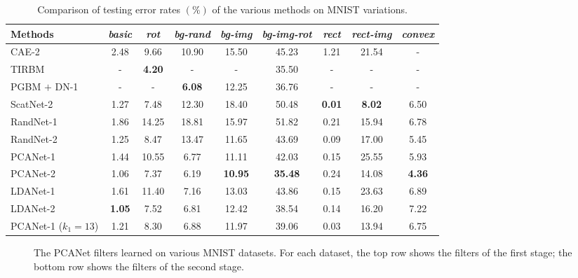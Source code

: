 \documentclass[10pt,journal,compsoc]{IEEEtran}
\begin{document}
\begin{table*}\centering
\caption{Comparison of testing error rates $(\%)$ of the various methods on MNIST variations.}
\vspace{0.1cm}\centering\begin{tabular}{l|c|c|c|c|c|c|c|c}
  \hline
Methods        & {\it basic} & {\it rot}             & {\it bg-rand} & {\it bg-img} & {\it bg-img-rot} & {\it rect} & {\it rect-img} & {\it convex} \\ \hline \hline
  CAE-2 \cite{Rifai2011}        &  2.48  & 9.66         & 10.90       &  15.50     & 45.23       & 1.21 & 21.54 & - \\
  TIRBM \cite{Sohn2012}         &  -     & {\bf 4.20}   &   -         &    -       & 35.50       &   -      &    -   &  - \\
  PGBM $+$ DN-1  \cite{Sohn2013}&   -    &      -       & {\bf 6.08}  &   12.25    &  36.76      & -   &   - &  - \\
  ScatNet-2 \cite{Bruna2013}    & 1.27   & 7.48         &  12.30      & 18.40      & 50.48       & {\bf 0.01} & {\bf 8.02} & 6.50 \\ \hline
  RandNet-1                     &   1.86 & 14.25        &    18.81    & 15.97      &  51.82      &  0.21  &  15.94 &   6.78 \\
  RandNet-2                     & 1.25   & 8.47         &    13.47    & 11.65      &  43.69      &  0.09  &  17.00  &  5.45   \\
  PCANet-1                      & 1.44   & 10.55        &  6.77       & 11.11      & 42.03       & 0.15  & 25.55  & 5.93 \\
  PCANet-2                      & 1.06   & 7.37         &  6.19       & {\bf 10.95}& {\bf 35.48} & 0.24 & 14.08 & {\bf 4.36} \\
  LDANet-1                      & 1.61   &   11.40      &     7.16    &  13.03     &   43.86     &    0.15 &   23.63 &    6.89 \\
  LDANet-2                      &{\bf 1.05} & 7.52      &     6.81    &  12.42     &   38.54     &    0.14 &   16.20 &    7.22 \\ \hline
  PCANet-1 ($k_1 = 13$)         & 1.21   & 8.30         & 6.88        &  11.97     &   39.06    &    0.03  &  13.94  &  6.75  \\
  \hline
\end{tabular}\label{table: mnist}
\end{table*}

\begin{figure*}[t]
\centering
{}
\caption{The PCANet filters learned on various MNIST datasets. For each dataset, the top row shows the filters of the first stage; the bottom row shows the filters of the second stage.} \label{fig: mnist_filters}
\end{figure*}
\end{document}
